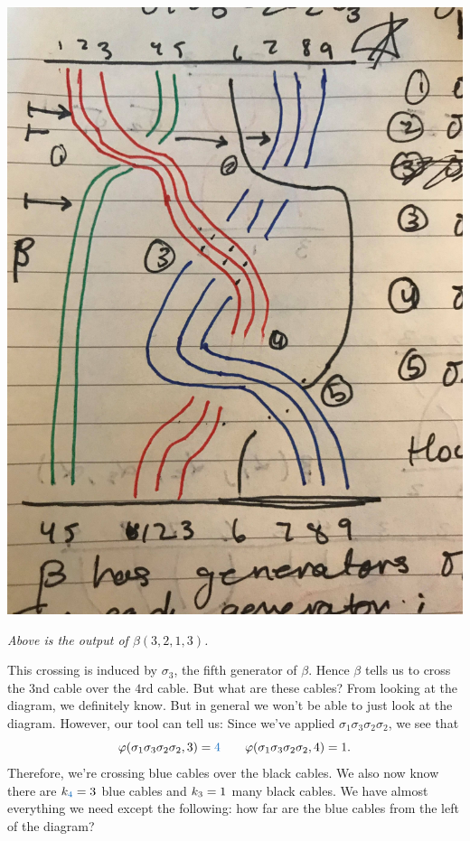 \begin{center}
    \hspace{1cm}
    \raisebox{2cm}{$\mapsto$}
    \hspace{1cm}
    \includegraphics[scale = 0.05]{chp9_operads/braids.jpg}
    
    \emph{Above is the output of $\beta(3, 2, 1, 3)$.}
\end{center}
This crossing is induced by $\sigma_3$, the fifth generator of $\beta$. 
Hence $\beta$ tells us to cross the $3$nd cable over the $4$rd cable. But what 
are these cables? From looking at the diagram, we definitely know. But in general we won't 
be able to just look at the diagram. However, our tool can tell us: Since we've applied $\sigma_1\sigma_3\sigma_2\sigma_2$, 
we see that 
\[
    \phi(\sigma_1\sigma_3\sigma_2\sigma_2, 3) = \textcolor{RoyalBlue}{4} \qquad \phi(\sigma_1\sigma_3\sigma_2\sigma_2, 4) = \textcolor{Black}{1}.
\]
Therefore, we're crossing blue cables over the black cables. We also now know there
are $k_{\textcolor{RoyalBlue}{4}} = 3$ blue cables and $k_{\textcolor{Black}{3}} = 1$ many black cables.
We have almost everything we need except the following: how far 
are the blue cables from the left of the diagram? 

